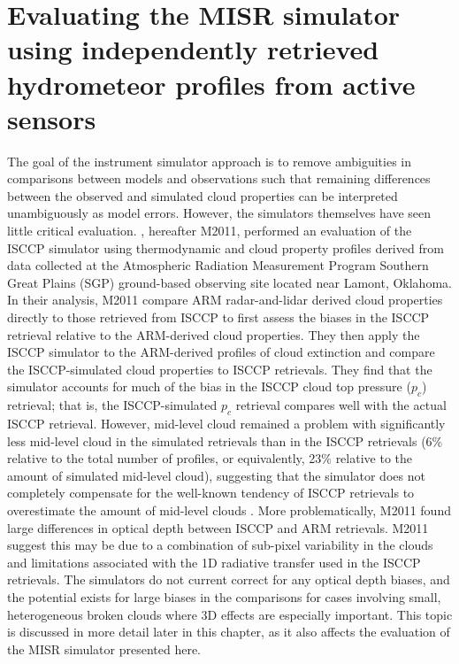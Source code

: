 \chapter{Evaluating the MISR simulator using independently retrieved
hydrometeor profiles from active sensors}\label{sec:misr}

The goal of the instrument simulator approach is to remove ambiguities
in comparisons between models and observations such that remaining
differences between the observed and simulated cloud properties can be
interpreted unambiguously as model errors. However, the simulators
themselves have seen little critical evaluation.
\citet{mace_et_al_2011}, hereafter M2011, performed an evaluation of the
ISCCP simulator using thermodynamic and cloud property profiles derived
from data collected at the Atmospheric Radiation Measurement Program
\citep[ARM;][]{ackerman_and_stokes_2003} Southern Great Plains (SGP)
ground-based observing site located near Lamont, Oklahoma. In their
analysis, M2011 compare ARM radar-and-lidar derived cloud properties
directly to those retrieved from ISCCP to first assess the biases in the
ISCCP retrieval relative to the ARM-derived cloud properties. They then
apply the ISCCP simulator to the ARM-derived profiles of cloud
extinction and compare the ISCCP-simulated cloud properties to ISCCP
retrievals. They find that the simulator accounts for much of the bias
in the ISCCP cloud top pressure (\(p_c\)) retrieval; that is, the
ISCCP-simulated \(p_c\) retrieval compares well with the actual ISCCP
retrieval. However, mid-level cloud remained a problem with
significantly less mid-level cloud in the simulated retrievals than in
the ISCCP retrievals (6\% relative to the total number of profiles, or
equivalently, 23\% relative to the amount of simulated mid-level cloud),
suggesting that the simulator does not completely compensate for the
well-known tendency of ISCCP retrievals to overestimate the amount of
mid-level clouds \citep[e.g.,][]{marchand_et_al_2010}. More
problematically, M2011 found large differences in optical depth between
ISCCP and ARM retrievals. M2011 suggest this may be due to a combination
of sub-pixel variability in the clouds and limitations associated with
the 1D radiative transfer used in the ISCCP retrievals. The simulators
do not current correct for any optical depth biases, and the potential
exists for large biases in the comparisons for cases involving small,
heterogeneous broken clouds where 3D effects are especially important.
This topic is discussed in more detail later in this chapter, as it also
affects the evaluation of the MISR simulator presented here.

